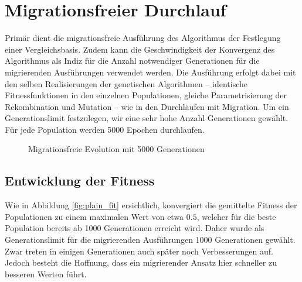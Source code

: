 \documentclass[12pt,a4paper]{article}
\begin{document}
\section{Migrationsfreier Durchlauf}
Primär dient die migrationsfreie Ausführung des Algorithmus der Festlegung einer Vergleichsbasis. Zudem kann die Geschwindigkeit der Konvergenz des Algorithmus als Indiz für die Anzahl notwendiger Generationen für die migrierenden Ausführungen verwendet werden. Die Ausführung erfolgt dabei mit den selben Realisierungen der genetischen Algorithmen -- identische Fitnessfunktionen in den einzelnen Populationen, gleiche Parametrisierung der Rekombination und Mutation -- wie in den Durchläufen mit Migration. Um ein Generationslimit festzulegen, wir eine sehr hohe Anzahl Generationen gewählt. Für jede Population werden 5000 Epochen durchlaufen.
\begin{figure}
\centering
	\caption{Migrationsfreie Evolution mit 5000 Generationen}
\end{figure}

\subsection{Entwicklung der Fitness}
Wie in Abbildung \ref{fig:plain_fit} ersichtlich, konvergiert die gemittelte Fitness der Populationen zu einem maximalen Wert von etwa $0.5$, welcher für die beste Population bereits ab 1000 Generationen erreicht wird. Daher wurde als Generationslimit für die migrierenden Ausführungen 1000 Generationen gewählt. Zwar treten in einigen Generationen auch später noch Verbesserungen auf. Jedoch besteht die Hoffnung, dass ein migrierender Ansatz hier schneller zu besseren Werten führt.
\end{document}
